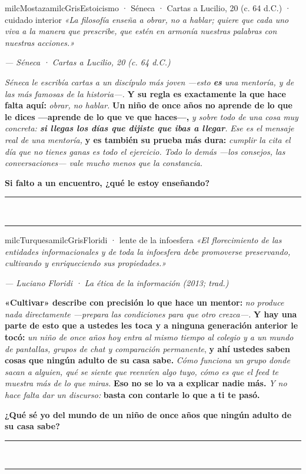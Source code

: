 \documentclass[11pt,letterpaper]{article}
\newcommand{\linead}[1]{\noindent\color{milcLinea}\rule{#1}{0.5pt}\color{milcNegro}}
\begin{document}
\begin{softbox}{milcMostaza}{milcGris}{Estoicismo · Séneca · Cartas a Lucilio, 20 (c. 64 d.C.) · cuidado interior}
\textit{«La filosofía enseña a obrar, no a hablar; quiere que cada uno viva a la manera que prescribe, que estén en armonía nuestras palabras con nuestras acciones.»}

{\footnotesize\itshape\color{milcNegro!70}--- Séneca · Cartas a Lucilio, 20 (c. 64 d.C.)}

\emph{Séneca le escribía cartas a un discípulo más joven ---esto \textbf{es} una mentoría, y de las más famosas de la historia---.} \textbf{Y su regla es exactamente la que hace falta aquí:} \emph{obrar, no hablar.} \textbf{Un niño de once años no aprende de lo que le dices ---aprende de lo que ve que haces---,} \emph{y sobre todo de una cosa muy concreta: \textbf{si llegas los días que dijiste que ibas a llegar}.} \emph{Ese es el mensaje real de una mentoría,} \textbf{y es también su prueba más dura:} \emph{cumplir la cita el día que no tienes ganas es todo el ejercicio.} \emph{Todo lo demás ---los consejos, las conversaciones--- vale mucho menos que la constancia.}

\textbf{Si falto a un encuentro, ¿qué le estoy enseñando?}
\end{softbox}
\linead{\linewidth}\\[1mm]
\linead{\linewidth}

\begin{softbox}{milcTurquesa}{milcGris}{Floridi · lente de la infoesfera}
\textit{«El florecimiento de las entidades informacionales y de toda la infoesfera debe promoverse preservando, cultivando y enriqueciendo sus propiedades.»}

{\footnotesize\itshape\color{milcNegro!70}--- Luciano Floridi · La ética de la información (2013; trad.)}

\textbf{«Cultivar» describe con precisión lo que hace un mentor:} \emph{no produce nada directamente ---prepara las condiciones para que otro crezca---.} \textbf{Y hay una parte de esto que a ustedes les toca y a ninguna generación anterior le tocó:} \emph{un niño de once años hoy entra al mismo tiempo al colegio y a un mundo de pantallas, grupos de chat y comparación permanente}, \textbf{y ahí ustedes saben cosas que ningún adulto de su casa sabe.} \emph{Cómo funciona un grupo donde sacan a alguien, qué se siente que reenvíen algo tuyo, cómo es que el feed te muestra más de lo que miras.} \textbf{Eso no se lo va a explicar nadie más.} \emph{Y no hace falta dar un discurso:} \textbf{basta con contarle lo que a ti te pasó.}

\textbf{¿Qué sé yo del mundo de un niño de once años que ningún adulto de su casa sabe?}
\end{softbox}
\linead{\linewidth}\\[1mm]
\linead{\linewidth}
\end{document}
